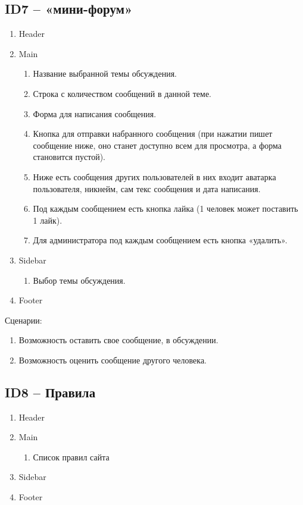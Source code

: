 \documentclass[a4paper]{article}
\begin{document}
		\subsection{ID7 – «мини-форум»}
			\begin{enumerate}
				\item Header
				\item Main
				\begin{enumerate}
					\item Название выбранной темы обсуждения.
					\item Строка с количеством сообщений в данной теме.
					\item Форма для написания сообщения.
					\item Кнопка для отправки набранного сообщения (при нажатии пишет сообщение ниже, оно станет доступно всем для просмотра, а форма становится пустой).
					\item Ниже есть сообщения других пользователей в них входит аватарка пользователя, никнейм, сам текс сообщения и дата написания.
					\item Под каждым сообщением есть кнопка лайка (1 человек может поставить 1 лайк).
					\item Для администратора под каждым сообщением есть кнопка «удалить».
				\end{enumerate}
				\item Sidebar
					\begin{enumerate}
						\item Выбор темы обсуждения.
					\end{enumerate}
				\item Footer
			\end{enumerate}
			\large{Сценарии:}
				\begin{enumerate}
					\item Возможность оставить свое сообщение, в обсуждении.
					\item Возможность оценить сообщение другого человека.
				\end{enumerate}
		\newpage
		\subsection{ID8 – Правила}
			\begin{enumerate}
				\item Header
				\item Main
				\begin{enumerate}
					\item Список правил сайта
				\end{enumerate}
				\item Sidebar
				\item Footer
			\end{enumerate}
\end{document}

